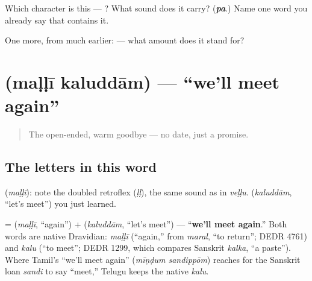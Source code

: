 \begin{tcolorbox}[breakable,colback=teal!4,colframe=teal!35!black,title={Before you move on}]
Which character is this — ? What sound does it carry? (\emph{\textbf{pa}}.) Name one word you already say that contains it.

One more, from much earlier:  — what amount does it stand for?
\end{tcolorbox}
\section[\texorpdfstring{\te{మళ్ళీ} \te{కలుద్దాం} (maḷḷī kaluddām)}{మళ్ళీ కలుద్దాం (maḷḷī kaluddām)}]{  (maḷḷī kaluddām) — \textquotedblleft{}we'll meet again\textquotedblright{}}

\label{lesson:TE-C04-malli-kaluddaam}



\begin{quote}
The open-ended, warm goodbye — no date, just a promise.
\end{quote}

\subsection*{The letters in this word}
\textbf{} (\emph{maḷḷī}): note the doubled retroflex \textbf{} (\emph{ḷḷ}), the same sound as in \emph{veḷḷu}. \textbf{} (\emph{kaluddām}, \textquotedblleft{}let's meet\textquotedblright{}) you just learned.

\begin{cousinweb}
\textbf{ } = \textbf{} (\emph{maḷḷī}, \textquotedblleft{}again\textquotedblright{}) + \textbf{} (\emph{kaluddām}, \textquotedblleft{}let's meet\textquotedblright{}) — \textquotedblleft{}\textbf{we'll meet again}.\textquotedblright{} Both words are native Dravidian: \emph{maḷḷī} (\textquotedblleft{}again,\textquotedblright{} from \emph{maral}, \textquotedblleft{}to return\textquotedblright{}; DEDR 4761) and \emph{kalu} (\textquotedblleft{}to meet\textquotedblright{}; DEDR 1299, which compares Sanskrit \emph{kalka}, \textquotedblleft{}a paste\textquotedblright{}). Where Tamil's \textquotedblleft{}we'll meet again\textquotedblright{} (\emph{mīṇḍum sandippōm}) reaches for the Sanskrit loan \emph{sandi} to say \textquotedblleft{}meet,\textquotedblright{} Telugu keeps the native \emph{kalu}.
\end{cousinweb}

